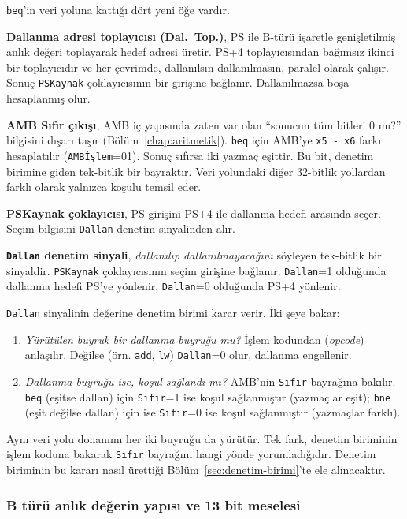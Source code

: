 \texttt{beq}'in veri yoluna kattığı dört yeni öğe vardır.

\textbf{Dallanma adresi toplayıcısı (Dal.\ Top.)}, PS ile B-türü işaretle genişletilmiş anlık değeri toplayarak hedef adresi üretir. PS+4 toplayıcısından bağımsız ikinci bir toplayıcıdır ve her çevrimde, dallanılsın dallanılmasın, paralel olarak çalışır. Sonuç \texttt{PSKaynak} çoklayıcısının bir girişine bağlanır. Dallanılmazsa boşa hesaplanmış olur.

\textbf{AMB Sıfır çıkışı}, AMB iç yapısında zaten var olan ``sonucun tüm bitleri 0 mı?'' bilgisini dışarı taşır (Bölüm~\ref{chap:aritmetik}). \texttt{beq} için AMB'ye \texttt{x5 - x6} farkı hesaplatılır (\texttt{AMBİşlem}=01). Sonuç sıfırsa iki yazmaç eşittir. Bu bit, denetim birimine giden tek-bitlik bir bayraktır. Veri yolundaki diğer 32-bitlik yollardan farklı olarak yalnızca koşulu temsil eder.

\textbf{PSKaynak çoklayıcısı}, PS girişini PS+4 ile dallanma hedefi arasında seçer. Seçim bilgisini \texttt{Dallan} denetim sinyalinden alır.

\textbf{\texttt{Dallan} denetim sinyali}, \emph{dallanılıp dallanılmayacağını} söyleyen tek-bitlik bir sinyaldir. \texttt{PSKaynak} çoklayıcısının seçim girişine bağlanır. \texttt{Dallan}=1 olduğunda dallanma hedefi PS'ye yönlenir, \texttt{Dallan}=0 olduğunda PS+4 yönlenir.

\texttt{Dallan} sinyalinin değerine denetim birimi karar verir. İki şeye bakar:
\begin{enumerate}
    \item \emph{Yürütülen buyruk bir dallanma buyruğu mu?} İşlem kodundan (\emph{opcode}) anlaşılır. Değilse (örn. \texttt{add}, \texttt{lw}) \texttt{Dallan}=0 olur, dallanma engellenir.
    \item \emph{Dallanma buyruğu ise, koşul sağlandı mı?} AMB'nin \texttt{Sıfır} bayrağına bakılır. \texttt{beq} (eşitse dallan) için \texttt{Sıfır}=1 ise koşul sağlanmıştır (yazmaçlar eşit); \texttt{bne} (eşit değilse dallan) için ise \texttt{Sıfır}=0 ise koşul sağlanmıştır (yazmaçlar farklı).
\end{enumerate}

Aynı veri yolu donanımı her iki buyruğu da yürütür. Tek fark, denetim biriminin işlem koduna bakarak \texttt{Sıfır} bayrağını hangi yönde yorumladığıdır. Denetim biriminin bu kararı nasıl ürettiği Bölüm~\ref{sec:denetim-birimi}'te ele alınacaktır.

\subsubsection*{B türü anlık değerin yapısı ve 13 bit meselesi}


